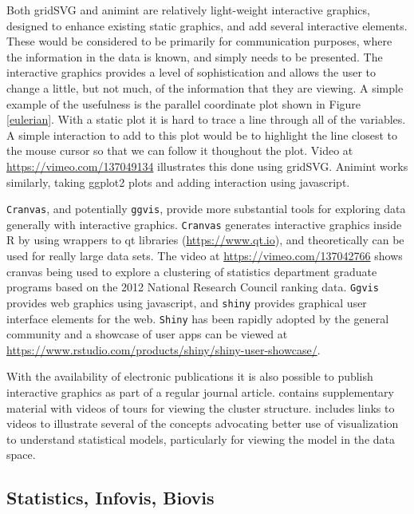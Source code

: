 \documentclass[11pt]{article}
\begin{document}
\begin{itemize}
Both gridSVG and animint are relatively light-weight interactive graphics, designed to enhance existing static graphics, and add several interactive elements. These would be considered to be primarily for communication purposes, where the information in the data is known, and simply needs to be presented. The interactive graphics provides a level of sophistication and allows the user to change a little, but not much, of the information that they are viewing. A simple example of the usefulness is the parallel coordinate plot shown in Figure \ref{eulerian}. With a static plot it is hard to trace a line through all of the variables. A simple interaction to add to this plot would be to highlight the line closest to the mouse cursor so that we can follow it thoughout the plot. Video at \url{https://vimeo.com/137049134} illustrates this done using gridSVG. Animint works similarly, taking ggplot2 plots and adding interaction using javascript. 

{\tt Cranvas}, and potentially {\tt ggvis}, provide more substantial tools for exploring data generally with interactive graphics. {\tt Cranvas} generates interactive graphics inside R by using wrappers to qt libraries (\url{https://www.qt.io}), and theoretically can be used for really large data sets. The video at \url{https://vimeo.com/137042766} shows cranvas being used to explore a clustering of statistics department graduate programs based on the 2012 National Research Council ranking data. {\tt Ggvis} provides web graphics using javascript, and {\tt shiny} provides graphical user interface elements for the web. {\tt Shiny} has been rapidly adopted by the general community and a showcase of user apps can be viewed at \url{https://www.rstudio.com/products/shiny/shiny-user-showcase/}.

With the availability of electronic publications it is also possible to publish interactive graphics as part of a regular journal article. \citet{newell} contains supplementary material with videos of tours for viewing the cluster structure. \citet{modelvis} includes links to videos to illustrate several of the concepts advocating better use of visualization to understand statistical models, particularly for viewing the model in the data space. 

\end{itemize}

\subsection{Statistics, Infovis, Biovis}
\end{document}
